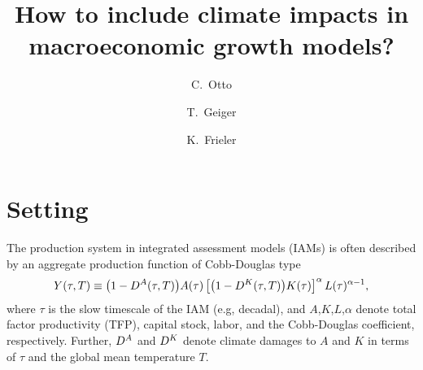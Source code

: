\documentclass[preprint,3p,authoryear]{elsarticle}
\begin{document}

\begin{frontmatter}

  \title{How to include climate impacts in macroeconomic growth models?}

\author[PIK]{C.~Otto}



\author[PIK]{T.~Geiger}
\author[PIK]{K.~Frieler}


\address[PIK]{Potsdam Institute for Climate Impact Research, Potsdam, Germany}




\end{frontmatter}



\section{Setting}
\label{sec:set}
The production system in integrated assessment models (IAMs) is often described by an aggregate production function of Cobb-Douglas type
\begin{equation}
  \label{eq:CD}
  Y(\tau,T)\equiv \big(1-D^A(\tau,T)\big)A(\tau)\left[\big(1-D^K(\tau,T)\big)K(\tau) \right]^\alpha L(\tau)^{\alpha-1},
\end{equation}
where $\tau$ is the slow timescale of the IAM (e.g, decadal), and $A$,$K$,$L$,$\alpha$ denote total factor productivity (TFP), capital stock, labor, and the Cobb-Douglas coefficient, respectively. Further, $D^A$ and $D^K$ denote climate damages to $A$ and $K$ in terms of $\tau$ and the global mean temperature $T$.
\end{document}
